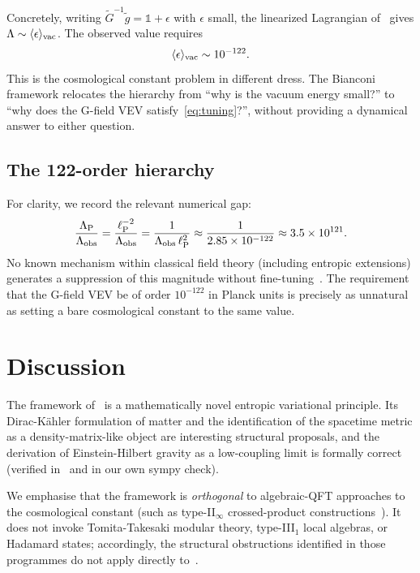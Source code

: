 \documentclass[aps,prd,twocolumn,preprintnumbers,superscriptaddress]{revtex4-2}
\newcommand{\tg}{\tilde{g}}
\newcommand{\tG}{\tilde{G}}
\newcommand{\lP}{\ell_{\rm P}}
\newcommand{\Lobs}{\Lambda_{\rm obs}}
\newcommand{\Lpl}{\Lambda_{\rm P}}
\begin{document}
Concretely, writing $\tG^{-1}\tg = \mathbb{1} + \epsilon$ with
$\epsilon$ small, the linearized Lagrangian of~\cite{Bianconi2025} gives
$\Lambda\sim \langle\epsilon\rangle_{\rm vac}$.
The observed value requires
\begin{equation}
  \langle\epsilon\rangle_{\rm vac} \sim 10^{-122}.
  \label{eq:tuning}
\end{equation}
This is the cosmological constant problem in different dress.
The Bianconi framework relocates the hierarchy from ``why is the vacuum
energy small?'' to ``why does the G-field VEV satisfy~\eqref{eq:tuning}?'',
without providing a dynamical answer to either question.

\subsection{The 122-order hierarchy}

For clarity, we record the relevant numerical gap:
\begin{equation}
  \frac{\Lpl}{\Lobs} = \frac{\lP^{-2}}{\Lobs}
  = \frac{1}{\Lobs\,\lP^2}
  \approx \frac{1}{2.85\times 10^{-122}} \approx 3.5\times 10^{121}.
  \label{eq:hierarchy}
\end{equation}
No known mechanism within classical field theory (including entropic
extensions) generates a suppression of this magnitude without
fine-tuning~\cite{Weinberg1989,Carroll2001}.
The requirement that the G-field VEV be of order $10^{-122}$ in Planck
units is precisely as unnatural as setting a bare cosmological constant
to the same value.

\section{Discussion}
\label{sec:discussion}

The framework of~\cite{Bianconi2025} is a mathematically novel entropic
variational principle.  Its Dirac-K\"{a}hler formulation of matter
and the identification of the spacetime metric as a density-matrix-like
object are interesting structural proposals, and the derivation of
Einstein-Hilbert gravity as a low-coupling limit is formally correct
(verified in~\cite{Bianconi2025} and in our own sympy check).

We emphasise that the framework is \emph{orthogonal} to algebraic-QFT
approaches to the cosmological constant (such as type-II$_\infty$
crossed-product constructions~\cite{Witten2022,CLPW2023,Faulkner2024}).
It does not invoke Tomita-Takesaki modular theory, type-III$_1$ local
algebras, or Hadamard states; accordingly, the structural obstructions
identified in those programmes do not apply directly to~\cite{Bianconi2025}.
\end{document}
